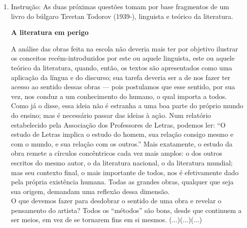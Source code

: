 \documentclass[10pt,a4paper]{article}
\begin{document}
\begin{multicols}{2}
\begin{enumerate}
	\item Instru\c{c}\~ao: As duas pr\'oximas quest\~oes tomam por base fragmentos de um livro do b\'ulgaro Tzvetan Todorov (1939-), linguista e te\'orico da literatura. \\
	\begin{center} \textbf{ A literatura em perigo} \end{center} 
	A an\'alise das obras feita na escola n\~ao deveria mais ter por objetivo ilustrar os conceitos rec\'em-introduzidos por este ou aquele linguista, este ou aquele te\'orico da literatura, quando, ent\~ao, os textos s\~ao apresentados como uma aplica\c{c}\~ao da l\'ingua e do discurso; sua tarefa deveria ser a de nos fazer ter acesso ao sentido dessas obras — pois postulamos que esse sentido, por sua vez, nos conduz a um conhecimento do humano, o qual importa a todos. Como j\'a o disse, essa ideia n\~ao \'e estranha a uma boa parte do pr\'oprio mundo do ensino; mas \'e necess\'ario passar das ideias \`a a\c{c}\~ao. Num relat\'orio estabelecido pela Associa\c{c}\~ao dos Professores de Letras, podemos ler: “O estudo de Letras implica o estudo do homem, sua rela\c{c}\~ao consigo mesmo e com o mundo, e sua rela\c{c}\~ao com os outros.” Mais exatamente, o estudo da obra remete a c\'irculos conc\^entricos cada vez mais amplos: o dos outros escritos do mesmo autor, o da literatura nacional, o da literatura mundial; mas seu contexto final, o mais importante de todos, nos \'e efetivamente dado pela pr\'opria exist\^encia humana. Todas as grandes obras, qualquer que seja sua origem, demandam uma reflex\~ao dessa dimens\~ao.\\
  O que devemos fazer para desdobrar o sentido de uma obra e revelar o pensamento do artista? Todos os “m\'etodos” s\~ao bons, desde que continuem a ser meios, em vez de se tornarem fins em si mesmos. (...)(...)(...) \\

\end{enumerate}
\end{multicols}
\end{document}
